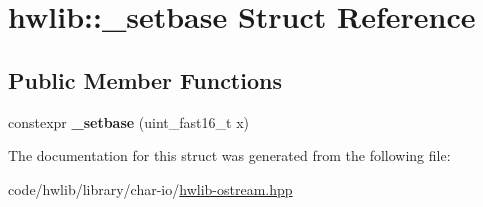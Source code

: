 \hypertarget{structhwlib_1_1__setbase}{}\section{hwlib\+:\+:\+\_\+setbase Struct Reference}
\label{structhwlib_1_1__setbase}
\subsection*{Public Member Functions}
\begin{DoxyCompactItemize}
\item 
\mbox{\label{structhwlib_1_1__setbase_a39da49d5384036925c96cd5192e73379}} 
constexpr {\bfseries \+\_\+setbase} (uint\+\_\+fast16\+\_\+t x)
\end{DoxyCompactItemize}


The documentation for this struct was generated from the following file\+:\begin{DoxyCompactItemize}
\item 
code/hwlib/library/char-\/io/\hyperlink{hwlib-ostream_8hpp}{hwlib-\/ostream.\+hpp}\end{DoxyCompactItemize}
